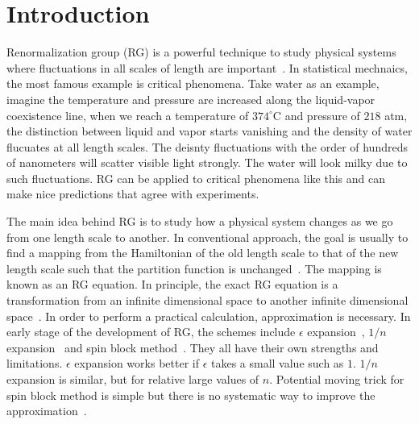 \documentclass[aps,prb,reprint,superscriptaddress]{revtex4-2}
\begin{document}
\section{Introduction\label{intro}}
Renormalization group (RG) is a powerful technique to study physical
systems where fluctuations in all scales of length are
important~\cite{wilsonNobel}. In statistical mechnaics, the most famous
example is critical phenomena. Take water as an example, imagine the
temperature and pressure are increased along the liquid-vapor
coexistence line, when we reach a temperature of $374^\circ$C and
pressure of $218$ atm, the distinction between liquid and vapor starts
vanishing and the density of water flucuates at all length scales. The
deisnty fluctuations with the order of hundreds of nanometers will
scatter visible light strongly. The water will look milky due to such
fluctuations. RG can be applied to critical phenomena like this and can
make nice predictions that agree with experiments. 
%

The main idea behind RG is to study how a physical system changes as we
go from one length scale to another. In conventional approach, the
goal is usually to find a mapping from the Hamiltonian of the
old length scale to that of the new length scale such that the partition
function is unchanged~\cite{nonlinearRG}. The mapping is known as an RG
equation. In principle, the exact RG equation is a transformation from
an infinite dimensional space to another infinite dimensional
space~\cite{wilsonNobel,wilson1970a}. In order to perform a practical
calculation, approximation is necessary. In early stage of the
development of RG, the schemes include $\epsilon$
expansion~\cite{wilson1972}, $1/n$ expansion~\cite{largeNexp} and spin
block
method~\cite{kadanoff1966,kadanoff1975,migdal,kadanoff1976,niemeijer1973}.
They all have their own strengths and limitations. $\epsilon$ expansion
works better if $\epsilon$ takes a small value such as $1$. $1/n$
expansion is similar, but for relative large values of $n$. Potential
moving trick for spin block method is simple but there is no systematic
way to improve the approximation~\cite{kardar2007}.
%
\end{document}
